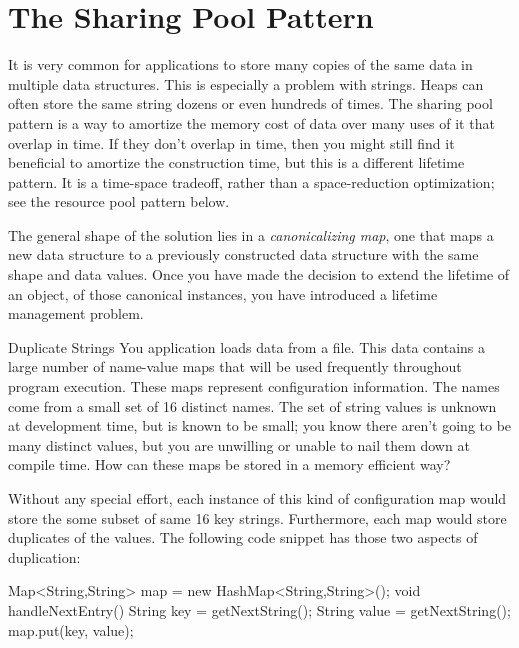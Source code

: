\section{The Sharing Pool Pattern}
\label{sec:sharing-pools}

 It is very common for
applications to store many copies of the same data in multiple data structures.
This is especially a problem with strings. Heaps can often store the same string
dozens or even hundreds of times. The sharing pool pattern is a way to amortize
the memory cost of data over many uses of it that overlap in time. If they don't
overlap in time, then you might still find it beneficial to amortize the
construction time, but this is a different lifetime pattern. It is a time-space
tradeoff, rather than a space-reduction optimization; see the resource pool
pattern below.

The general shape of the solution lies in a \emph{canonicalizing map}, one that
maps a new data structure to a previously constructed data structure with the
same shape and data values. Once you have made the decision to extend the
lifetime of an object, of those canonical instances, you have introduced a
lifetime management problem.


\begin{example}{Duplicate Strings}
You application loads data from a file. This data contains a large number of
name-value maps that will be used frequently throughout program execution.
These maps represent configuration information. The names come from a small set
of 16 distinct names. The set of string values 
is unknown at development time, but is known to be small;
you know there aren't going to be many distinct values, but you are unwilling or
unable to nail them down at compile time. How can these maps be stored in a memory
efficient way?
\end{example}

Without any special effort, each instance of this kind of configuration map
would store the some subset of same 16 key strings. Furthermore, each map would
store duplicates of the values. The following code snippet has those two
aspects of duplication:

\begin{shortlisting}
Map<String,String> map = new HashMap<String,String>();
void handleNextEntry() {
   String key = getNextString();
   String value = getNextString();
   map.put(key, value);
}
\end{shortlisting} 

